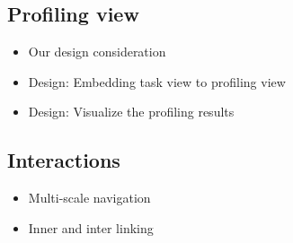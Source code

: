 \subsection{Profiling view}
\begin{itemize}
    \item Our design consideration
    \item Design: Embedding task view to profiling view
    \item Design: Visualize the profiling results
\end{itemize}

\subsection{Interactions}
\begin{itemize}
    \item Multi-scale navigation
    \item Inner and inter linking
\end{itemize}
